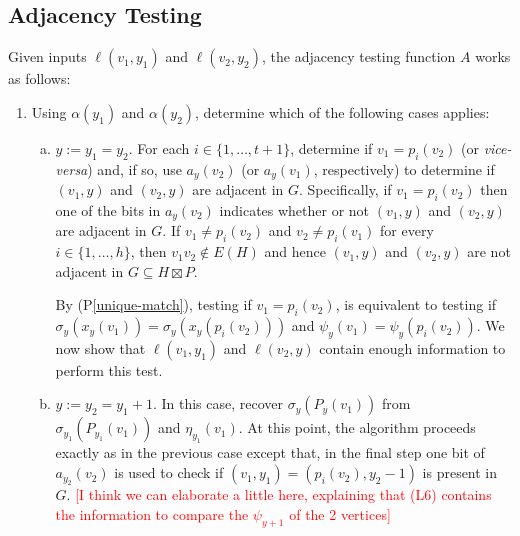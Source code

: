 \documentclass{patmorin}
\newcommand{\pref}[1]{(P\ref{#1})}
\begin{document}
\subsection{Adjacency Testing}

Given inputs $\ell(v_1,y_1)$ and $\ell(v_2,y_2)$, the adjacency testing function $A$ works as follows:
\begin{enumerate}
    \item Using $\alpha(y_1)$ and $\alpha(y_2)$, determine which of the following cases applies:
    \begin{enumerate}[(a)]
        \item $y:=y_1=y_2$.  For each $i\in\{1,\ldots,t+1\}$, determine if $v_1=p_i(v_2)$ (or \textit{vice-versa}) and, if so, use $a_y(v_2)$ (or $a_y(v_1)$, respectively) to determine if $(v_1,y)$ and $(v_2,y)$ are adjacent in $G$. Specifically, if $v_1=p_i(v_2)$ then one of the bits in $a_y(v_2)$ indicates whether or not $(v_1,y)$ and $(v_2,y)$ are adjacent in $G$. If $v_1\neq p_i(v_2)$ and $v_2\neq p_i(v_1)$ for every $i\in\{1,\ldots,h\}$, then $v_1v_2\not\in E(H)$ and hence $(v_1,y)$ and $(v_2,y)$ are not adjacent in $G\subseteq H\boxtimes P$.

        By \pref{unique-match}, testing if $v_1=p_i(v_2)$, is equivalent to testing if $\sigma_y(x_y(v_1))=\sigma_y(x_y(p_i(v_2)))$ and $\psi_y(v_1)=\psi_y(p_i(v_2))$. We now show that $\ell(v_1,y_1)$ and $\ell(v_2,y)$ contain enough information to perform this test.
        \item $y:=y_2=y_1+1$.  In this case, recover $\sigma_y(P_y(v_1))$ from $\sigma_{y_1}(P_{y_1}(v_1))$ and $\eta_{y_1}(v_1)$.  At this point, the algorithm proceeds exactly as in the previous case except that, in the final step one bit of $a_{y_2}(v_2)$ is used to check if $(v_1,y_1)=(p_i(v_2),y_2-1)$ is present in $G$. \textcolor{red}{[I think we can elaborate a little here, explaining that (L6) contains the information to compare the $\psi_{y+1}$ of the 2 vertices]}


\end{enumerate}
\end{enumerate}
\end{document}
